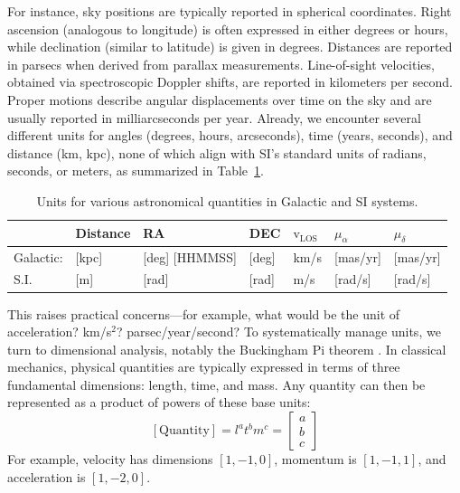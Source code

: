     For instance, sky positions are typically reported in spherical coordinates. Right ascension (analogous to longitude) is often expressed in either degrees or hours, while declination (similar to latitude) is given in degrees. Distances are reported in parsecs when derived from parallax measurements. Line-of-sight velocities, obtained via spectroscopic Doppler shifts, are reported in kilometers per second. Proper motions describe angular displacements over time on the sky and are usually reported in milliarcseconds per year. Already, we encounter several different units for angles (degrees, hours, arcseconds), time (years, seconds), and distance (km, kpc), none of which align with SI's standard units of radians, seconds, or meters, as summarized in Table~\ref{tab:units}.
    \begin{table}[]
        \caption{Units for various astronomical quantities in Galactic and SI systems.}
        \label{tab:units}
        \begin{tabular}{l|l|l|l|l|l|l|}
                            & Distance  & RA                     & DEC                    & \textbf{$\mathrm{v}_\mathrm{LOS}$} & $\mu_\alpha$ & $\mu_\delta$ \\ \hline
            Galactic: & {[}kpc{]} & {[}deg{]} {[}HHMMSS{]} & {[}deg{]}              & km/s                      & {[}mas/yr{]} & {[}mas/yr{]} \\ \hline
            S.I.       & {[}m{]}   & {[}rad{]}              & {[}rad{]}              & m/s                       & {[}rad/s{]}  & {[}rad/s{]}  \\ 
        \end{tabular}
    \end{table}
    This raises practical concerns—for example, what would be the unit of acceleration? km/s$^2$? parsec/year/second? To systematically manage units, we turn to dimensional analysis, notably the Buckingham Pi theorem \parencite{1914PhRv....4..345B}. In classical mechanics, physical quantities are typically expressed in terms of three fundamental dimensions: length, time, and mass. Any quantity can then be represented as a product of powers of these base units:
    \begin{equation}
        \left[\mathrm{Quantity}\right] = l^a t^b m^c =
            \begin{bmatrix}
                a\\
                b\\
                c 
            \end{bmatrix}
    \end{equation}
    For example, velocity has dimensions $[1, -1, 0]$, momentum is $[1, -1, 1]$, and acceleration is $[1, -2, 0]$.

